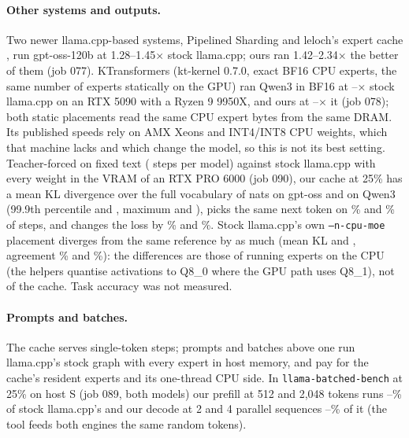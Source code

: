 \paragraph{Other systems and outputs.} Two newer llama.cpp-based systems, Pipelined Sharding \citep{pipelinedsharding2026} and
leloch's expert cache \citep{leloch2026}, run gpt-oss-120b at 1.28--1.45$\times$ stock llama.cpp; ours ran 1.42--2.34$\times$
the better of them (job 077). KTransformers \citep{ktransformers} (kt-kernel 0.7.0, exact BF16 CPU experts, the same
number of experts statically on the GPU) ran Qwen3 in BF16 at \ktOverLlamaMin--\ktOverLlamaMax$\times$ stock
llama.cpp on an RTX 5090 with a Ryzen 9 9950X, and ours at \ktOursOverMin--\ktOursOverMax$\times$ it (job 078); both
static placements read the same CPU expert bytes from the same DRAM. Its published speeds rely on AMX Xeons and
INT4/INT8 CPU weights, which that machine lacks and which change the model, so this is not its best setting. Teacher-forced on fixed text (\klStepsGpt{} steps per model) against stock llama.cpp with every weight in the
VRAM of an RTX PRO 6000 (job 090), our cache at 25\% has a mean KL divergence over the full vocabulary of
\klMeanGpt{} nats on gpt-oss and \klMeanQwen{} on Qwen3 (99.9th percentile \klNinetyNineGpt{} and \klNinetyNineQwen,
maximum \klMaxGpt{} and \klMaxQwen), picks the same next token on \klTopGpt\% and \klTopQwen\% of steps, and changes
the loss by \klNllGpt\% and \klNllQwen\%. Stock llama.cpp's own \texttt{--n-cpu-moe} placement diverges from the same
reference by as much (mean KL \klStockMeanGpt{} and \klStockMeanQwen, agreement \klStockTopGpt\% and \klStockTopQwen\%):
the differences are those of running experts on the CPU (the helpers quantise activations to Q8\_0 where the GPU path
uses Q8\_1), not of the cache. Task accuracy was not measured.

\paragraph{Prompts and batches.} The cache serves single-token steps; prompts and batches above one run llama.cpp's
stock graph with every expert in host memory, and pay for the cache's resident experts and its one-thread CPU side.
In \texttt{llama-batched-bench} at 25\% on host S (job 089, both models) our prefill at 512 and 2{,}048
tokens runs \bbPrefillMin--\bbPrefillMax\% of stock llama.cpp's and our decode at 2 and 4 parallel sequences
\bbBatchMin--\bbBatchMax\% of it (the tool feeds both engines the same random tokens).

